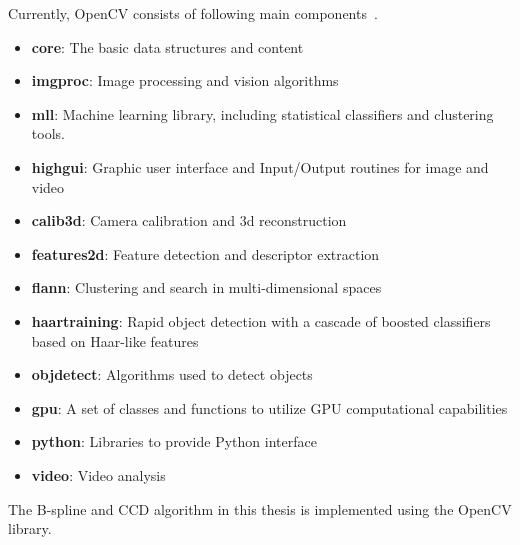 Currently, OpenCV consists of following main components~\cite{bradski2008learning}.
\begin{itemize}
\item \textbf{core}: The basic data structures and content
\item \textbf{imgproc}: Image processing and vision algorithms
\item \textbf{mll}: Machine learning library, including statistical classifiers and clustering tools.
\item \textbf{highgui}: Graphic user interface and Input/Output
  routines for image and video
\item \textbf{calib3d}: Camera calibration and 3d reconstruction
\item \textbf{features2d}: Feature detection and descriptor extraction
\item \textbf{flann}: Clustering and search in multi-dimensional spaces
\item \textbf{haartraining}: Rapid object detection with a cascade of boosted classifiers based on Haar-like features
\item \textbf{objdetect}: Algorithms used to detect objects
\item \textbf{gpu}: A set of classes and functions to utilize GPU computational capabilities
\item \textbf{python}: Libraries to provide Python interface
\item \textbf{video}: Video analysis
\end{itemize}

The B-spline and CCD algorithm in this thesis is implemented using the
OpenCV library.
